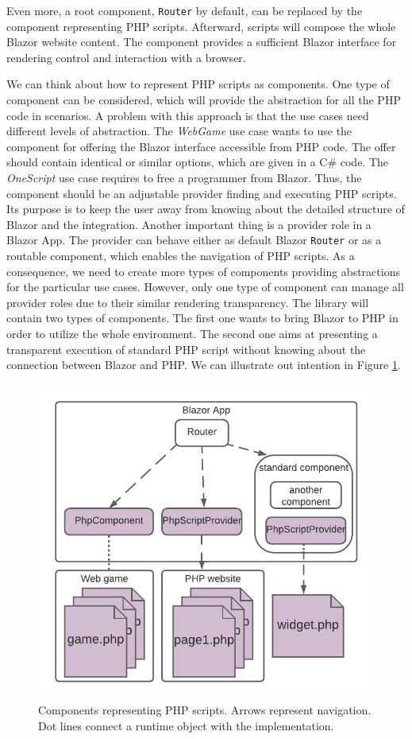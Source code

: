 Even more, a root component, \texttt{Router} by default, can be replaced by the component representing PHP scripts.
Afterward, scripts will compose the whole Blazor website content.
The component provides a sufficient Blazor interface for rendering control and interaction with a browser. 
\par
We can think about how to represent PHP scripts as components.
One type of component can be considered, which will provide the abstraction for all the PHP code in scenarios.
A problem with this approach is that the use cases need different levels of abstraction.
The \textit{WebGame} use case wants to use the component for offering the Blazor interface accessible from PHP code.
The offer should contain identical or similar options, which are given in a C\# code.
The \textit{OneScript} use case requires to free a programmer from Blazor.
Thus, the component should be an adjustable provider finding and executing PHP scripts.
Its purpose is to keep the user away from knowing about the detailed structure of Blazor and the integration.
Another important thing is a provider role in a Blazor App.
The provider can behave either as default Blazor \texttt{Router} or as a routable component, which enables the navigation of PHP scripts.
As a consequence, we need to create more types of components providing abstractions for the particular use cases.
However, only one type of component can manage all provider roles due to their similar rendering transparency.
The library will contain two types of components.
The first one wants to bring Blazor to PHP in order to utilize the whole environment.
The second one aims at presenting a transparent execution of standard PHP script without knowing about the connection between Blazor and PHP.
We can illustrate out intention in Figure \ref{img12:component}.
\par
\begin{figure}
\centering
\includegraphics[scale=0.9]{./img/Components}
\caption{Components representing PHP scripts. Arrows represent navigation. 
Dot lines connect a runtime object with the implementation.
}
\label{img12:component}
\end{figure} 
